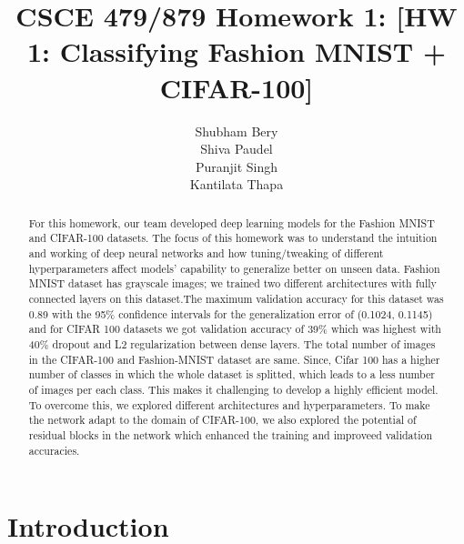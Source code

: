 \documentclass{article}
\title{CSCE 479/879 Homework 1: [HW 1: Classifying Fashion MNIST + CIFAR-100]}
\author{Shubham Bery \\
Shiva Paudel \\
Puranjit Singh \\
Kantilata Thapa}
\begin{document}
\maketitle

\begin{abstract} 
For this homework, our team developed deep learning models for the Fashion MNIST and CIFAR-100 datasets. The focus of this homework was to understand the intuition and working of deep neural networks and how tuning/tweaking of different hyperparameters affect models’ capability to generalize better on unseen data. Fashion MNIST dataset has grayscale images; we trained two different architectures with fully connected layers on this dataset.The maximum validation accuracy for this dataset was 0.89 with the 95\% confidence intervals for the generalization error of (0.1024, 0.1145) and for CIFAR 100 datasets we got validation accuracy of 39\% which was highest with 40\% dropout and L2 regularization between dense layers. The total number of images in the CIFAR-100 and Fashion-MNIST dataset are same. Since, Cifar 100 has a higher number of classes in which the whole dataset is splitted, which leads to a less number of images per each class. This makes it challenging to develop a highly efficient model. To overcome this, we explored different architectures and hyperparameters. To make the network adapt to the domain of CIFAR-100, we also explored the potential of residual blocks in the network which enhanced the training and improveed validation accuracies. 

\end{abstract}

\section{Introduction}
\label{sec:intro}
\end{document}
